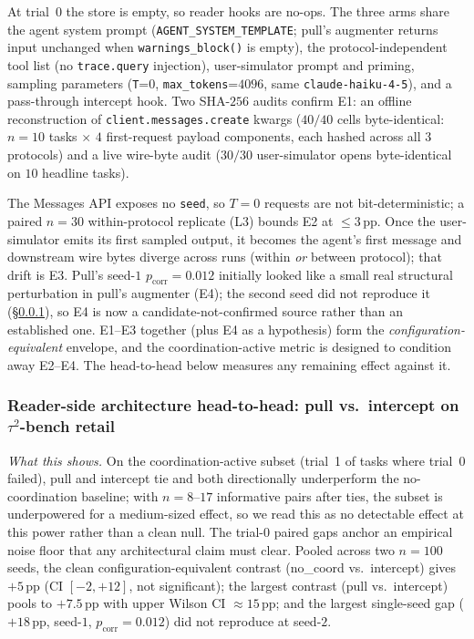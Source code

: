 At trial~$0$ the store is empty, so reader hooks are no-ops. The
three arms share the agent system prompt
(\texttt{AGENT\_SYSTEM\_TEMPLATE}; pull's augmenter returns input
unchanged when \texttt{warnings\_block()} is empty), the
protocol-independent tool list (no \texttt{trace.query}
injection), user-simulator prompt and priming, sampling parameters
(\texttt{T}{=}$0$, \texttt{max\_tokens}{=}$4096$, same
\texttt{claude-haiku-4-5}), and a pass-through intercept hook.
Two SHA-$256$ audits confirm E1: an offline reconstruction of
\texttt{client.messages.create} kwargs ($40/40$ cells
byte-identical: $n{=}10$ tasks $\times$ $4$ first-request
payload components, each hashed across all $3$ protocols) and a
live wire-byte audit ($30/30$ user-simulator opens
byte-identical on $10$ headline tasks).

The Messages API exposes no \texttt{seed}, so $T{=}0$ requests
are not bit-deterministic; a paired $n{=}30$ within-protocol
replicate (L3) bounds E2 at $\leq 3$\,pp. Once the user-simulator
emits its first sampled output, it becomes the agent's first
message and downstream wire bytes diverge across runs (within
\emph{or} between protocol); that drift is E3. Pull's
seed-$1$ $p_{\text{corr}}{=}0.012$ initially looked like a
small real structural perturbation in pull's augmenter (E4);
the second seed did not reproduce it (\S\ref{sec:eval:results:retail-intercept}),
so E4 is now a candidate-not-confirmed source rather than an
established one. E1--E3 together (plus E4 as a hypothesis) form
the \emph{configuration-equivalent} envelope, and the
coordination-active metric is designed to condition away E2--E4.
The head-to-head below measures any remaining effect against it.

\subsubsection{Reader-side architecture head-to-head: pull vs.\
intercept on $\tau^2$-bench retail}
\label{sec:eval:results:retail-intercept}

\textit{What this shows.} On the coordination-active subset
(trial~1 of tasks where trial~0 failed), pull and intercept tie
and both directionally underperform the no-coordination
baseline; with $n{=}8$--$17$ informative pairs after ties, the
subset is underpowered for a medium-sized effect, so we read
this as no detectable effect at this power rather than a clean
null. The trial-$0$ paired gaps anchor an empirical noise floor
that any architectural claim must clear. Pooled across two
$n{=}100$ seeds, the clean configuration-equivalent contrast
(no\_coord vs.\ intercept) gives $+5$\,pp (CI $[{-}2,{+}12]$,
not significant); the largest contrast (pull vs.\ intercept)
pools to $+7.5$\,pp with upper Wilson CI ${\approx}15$\,pp; and
the largest single-seed gap ($+18$\,pp, seed-$1$,
$p_{\text{corr}}{=}0.012$) did not reproduce at seed-$2$.

